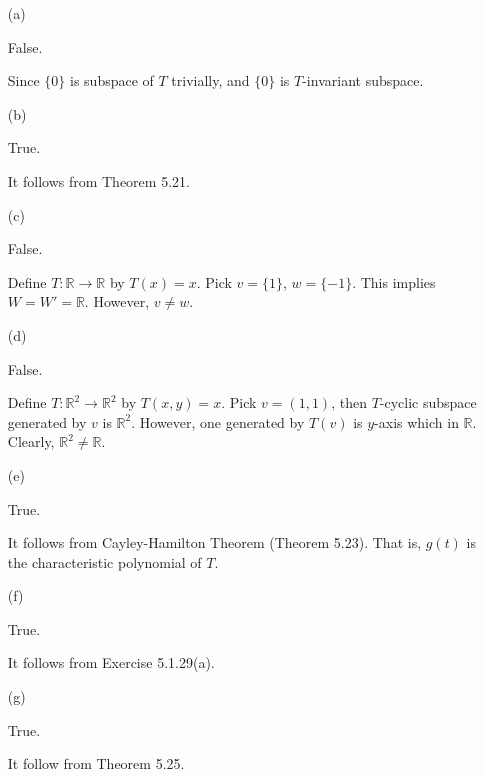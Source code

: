 \begin{Exercise}
	\begin{enumerate}[(a)]
		\item[(a)]
		\begin{answer}
			False.
		\end{answer}
		\begin{solution}
			Since $\{0\}$ is subspace of $T$ trivially, and $\{0\}$ is $T$-invariant subspace.
		\end{solution}
		
		\item[(b)]
		\begin{answer}
			True.
		\end{answer}
		\begin{solution}
			It follows from Theorem 5.21.
		\end{solution}
		
		\item[(c)]
		\begin{answer}
			False.
		\end{answer}
		\begin{solution}
			Define $T:\mathbb{R}\to\mathbb{R}$ by $T(x) = x$. Pick $v=\{1\}$, $w=\{-1\}$. This implies $W=W'=\mathbb{R}$. However, $v\neq w$.
		\end{solution}
		
		\item[(d)]
		\begin{answer}
			False.
		\end{answer}
		\begin{solution}
			Define $T:\mathbb{R}^2\to\mathbb{R}^2$ by $T(x,y) = x$. Pick $v = (1,1)$, then $T$-cyclic subspace generated by $v$ is $\mathbb{R}^2$. However, one generated by $T(v)$ is $y$-axis which in $\mathbb{R}$. Clearly, $\mathbb{R}^2 \neq \mathbb{R}$.
		\end{solution}
		
		\item[(e)]
		\begin{answer}
			True.
		\end{answer}
		\begin{solution}
			It follows from Cayley-Hamilton Theorem (Theorem 5.23). That is, $g(t)$ is the characteristic polynomial of $T$.
		\end{solution}
		
		\item[(f)]
		\begin{answer}
			True.
		\end{answer}
		\begin{solution}
			It follows from Exercise 5.1.29(a).
		\end{solution}
		
		\item[(g)]
		\begin{answer}
			True.
		\end{answer}
		\begin{solution}
			It follow from Theorem 5.25.
		\end{solution}
		
	\end{enumerate}
\end{Exercise}